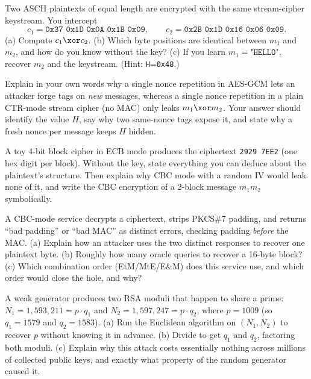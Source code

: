 \begin{exercise}
\label{ch38:ex-crib}
Two ASCII plaintexts of equal length are encrypted with the same stream-cipher keystream. You intercept
\[
c_1 = \texttt{0x37 0x1D 0x0A 0x1B 0x09}, \qquad c_2 = \texttt{0x2B 0x1D 0x16 0x06 0x09}.
\]
(a) Compute $c_1 \xor c_2$. (b) Which byte positions are identical between $m_1$ and $m_2$, and how do you know without the key? (c) If you learn $m_1 = \texttt{"HELLO"}$, recover $m_2$ and the keystream. (Hint: \texttt{H}=\texttt{0x48}.)
\end{exercise}

\begin{exercise}
\label{ch38:ex-gcm}
Explain in your own words why a single nonce repetition in AES-GCM lets an attacker forge tags on \emph{new} messages, whereas a single nonce repetition in a plain CTR-mode stream cipher (no MAC) only leaks $m_1 \xor m_2$. Your answer should identify the value $H$, say why two same-nonce tags expose it, and state why a fresh nonce per message keeps $H$ hidden.
\end{exercise}

\begin{exercise}
\label{ch38:ex-ecb-read}
A toy 4-bit block cipher in ECB mode produces the ciphertext \texttt{2929 7EE2} (one hex digit per block). Without the key, state everything you can deduce about the plaintext's structure. Then explain why CBC mode with a random IV would leak none of it, and write the CBC encryption of a 2-block message $m_1 m_2$ symbolically.
\end{exercise}

\begin{exercise}
\label{ch38:ex-padding}
A CBC-mode service decrypts a ciphertext, strips PKCS\#7 padding, and returns ``bad padding'' or ``bad MAC'' as distinct errors, checking padding \emph{before} the MAC. (a) Explain how an attacker uses the two distinct responses to recover one plaintext byte. (b) Roughly how many oracle queries to recover a 16-byte block? (c) Which combination order (EtM/MtE/E\&M) does this service use, and which order would close the hole, and why?
\end{exercise}

\begin{exercise}
\label{ch38:ex-gcd}
A weak generator produces two RSA moduli that happen to share a prime: $N_1 = 1{,}593{,}211 = p \cdot q_1$ and $N_2 = 1{,}597{,}247 = p \cdot q_2$, where $p = 1009$ (so $q_1 = 1579$ and $q_2 = 1583$). (a) Run the Euclidean algorithm on $(N_1, N_2)$ to recover $p$ without knowing it in advance. (b) Divide to get $q_1$ and $q_2$, factoring both moduli. (c) Explain why this attack costs essentially nothing across millions of collected public keys, and exactly what property of the random generator caused it.
\end{exercise}

